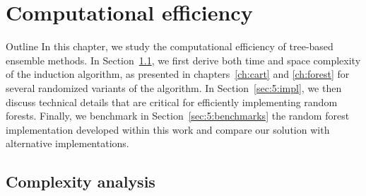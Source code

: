 \chapter{Computational efficiency}\label{ch:complexity}

\begin{remark}{Outline}
In this chapter, we study the computational efficiency of tree-based ensemble
methods. In Section~\ref{sec:5:complexity}, we first derive both time and space
complexity of the induction algorithm, as presented in chapters~\ref{ch:cart}
and \ref{ch:forest} for several randomized variants of the algorithm. In
Section~\ref{sec:5:impl}, we then discuss technical details that are critical
for efficiently  implementing random forests. Finally, we benchmark in
Section~\ref{sec:5:benchmarks} the random forest implementation developed
within this work and compare our solution with alternative implementations.
\end{remark}

\section{Complexity analysis}
\label{sec:5:complexity}









